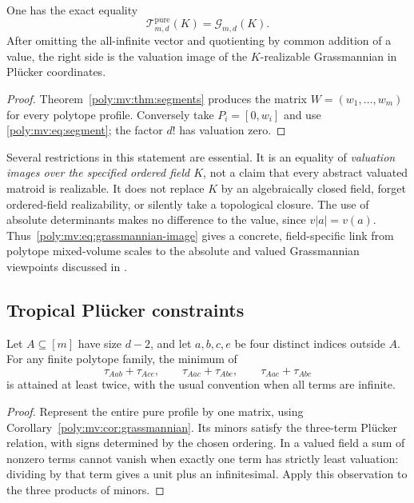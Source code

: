 \documentclass[11pt,a4paper]{article}
\numberwithin{equation}{section}
\theoremstyle{plain}
\begin{document}
\begin{corollary}
\label{poly:mv:cor:grassmannian}
One has the exact equality
\begin{equation}
\label{poly:mv:eq:grassmannian-image}
 \boxed{\mathcal T^{\mathrm{pure}}_{m,d}(K)=\mathcal G_{m,d}(K).}
\end{equation}
After omitting the all-infinite vector and quotienting by common addition
of a value, the right side is the valuation image of the $K$-realizable
Grassmannian in Pl\"ucker coordinates.
\end{corollary}
\begin{proof}
Theorem~\ref{poly:mv:thm:segments} produces the matrix $W=(w_1,\ldots,w_m)$
for every polytope profile. Conversely take $P_i=[0,w_i]$ and use
\eqref{poly:mv:eq:segment}; the factor $d!$ has valuation zero.
\end{proof}

Several restrictions in this statement are essential. It is an equality
of \emph{valuation images over the specified ordered field $K$}, not a
claim that every abstract valuated matroid is realizable. It does not
replace $K$ by an algebraically closed field, forget ordered-field
realizability, or silently take a topological closure. The use of
absolute determinants makes no difference to the value, since
$v|a|=v(a)$. Thus~\eqref{poly:mv:eq:grassmannian-image} gives a concrete,
field-specific link from polytope mixed-volume scales to the absolute
and valued Grassmannian viewpoints discussed in \cite{mv:ADRS}.

\subsection{Tropical Pl\"ucker constraints}
\begin{corollary}
\label{poly:mv:cor:plucker}
Let $A\subseteq[m]$ have size $d-2$, and let $a,b,c,e$ be four distinct
indices outside $A$. For any finite polytope family, the minimum of
\begin{equation}
\label{poly:mv:eq:tropical-plucker}
 \tau_{Aab}+\tau_{Ace},\qquad
 \tau_{Aac}+\tau_{Abe},\qquad
 \tau_{Aae}+\tau_{Abc}
\end{equation}
is attained at least twice, with the usual convention when all terms
are infinite.
\end{corollary}
\begin{proof}
Represent the entire pure profile by one matrix, using
Corollary~\ref{poly:mv:cor:grassmannian}. Its minors satisfy the three-term
Pl\"ucker relation, with signs determined by the chosen ordering. In a
valued field a sum of nonzero terms cannot vanish when exactly one term
has strictly least valuation: dividing by that term gives a unit plus
an infinitesimal. Apply this observation to the three products of minors.
\end{proof}
\end{document}
